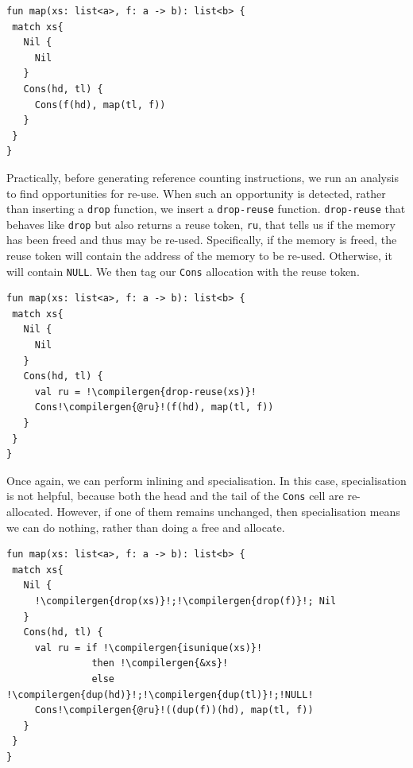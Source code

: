 \begin{code}
\label{code:koka-reuse-analysis}
\begin{verbatim}
fun map(xs: list<a>, f: a -> b): list<b> {
 match xs{
   Nil {
     Nil
   }
   Cons(hd, tl) {
     Cons(f(hd), map(tl, f))
   }
 }
}
\end{verbatim}
\end{code}

Practically, before generating reference counting instructions, we run an analysis to find opportunities for re-use. When such an opportunity is detected, rather than inserting a \texttt{drop} function, we insert a \texttt{drop-reuse} function. \texttt{drop-reuse} that behaves like \texttt{drop} but also returns a reuse token, \texttt{ru}, that tells us if the memory has been freed and thus may be re-used. Specifically, if the memory is freed, the reuse token will contain the address of the memory to be re-used. Otherwise, it will contain \texttt{NULL}. We then tag our \texttt{Cons} allocation with the reuse token. 

\begin{code}
\label{code:koka-reuse-token}
\begin{verbatim}
fun map(xs: list<a>, f: a -> b): list<b> {
 match xs{
   Nil {
     Nil
   }
   Cons(hd, tl) {
     val ru = !\compilergen{drop-reuse(xs)}!
     Cons!\compilergen{@ru}!(f(hd), map(tl, f))
   }
 }
}
\end{verbatim}
\end{code}

Once again, we can perform inlining and specialisation. In this case, specialisation is not helpful, because both the head and the tail of the \texttt{Cons} cell are re-allocated. However, if one of them remains unchanged, then specialisation means we can do nothing, rather than doing a free and allocate.

\begin{code}
\label{code:koka-reuse-specialisation}
\begin{verbatim}
fun map(xs: list<a>, f: a -> b): list<b> {
 match xs{
   Nil {
     !\compilergen{drop(xs)}!;!\compilergen{drop(f)}!; Nil
   }
   Cons(hd, tl) {
     val ru = if !\compilergen{isunique(xs)}! 
               then !\compilergen{&xs}!
               else !\compilergen{dup(hd)}!;!\compilergen{dup(tl)}!;!NULL!
     Cons!\compilergen{@ru}!((dup(f))(hd), map(tl, f))
   }
 }
}
\end{verbatim}
\end{code}

